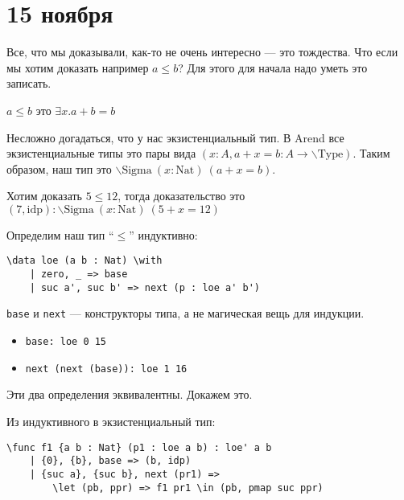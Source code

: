 \chapter{15 ноября}

Все, что мы доказывали, как-то не очень интересно --- это тождества. Что если мы хотим доказать например \(a \leq b\)? Для этого для начала надо уметь это записать.

\begin{definition}
    \(a \leq b\) это \(\exists x.a + b = b\)
\end{definition}

Несложно догадаться, что у нас экзистенциальный тип. В Arend все экзистенциальные типы это пары вида \((x : A, a + x = b : A \to \mathrm{\backslash Type})\). Таким образом, наш тип это \(\mathrm{\backslash Sigma}\ (x : \mathrm{Nat})\ (a + x = b)\).

\begin{example}
    Хотим доказать \(5 \leq 12\), тогда доказательство это \((7, \mathrm{idp}) : \mathrm{\backslash Sigma}\ (x : \mathrm{Nat})\ (5 + x = 12)\)
\end{example}

Определим наш тип ``\( \leq \)'' индуктивно:
\begin{verbatim}
\data loe (a b : Nat) \with
    | zero, _ => base
    | suc a', suc b' => next (p : loe a' b')
\end{verbatim}

\begin{remark}
    \texttt{base} и \texttt{next} --- конструкторы типа, а не магическая вещь для индукции.
\end{remark}

\begin{example}\itemfix
    \begin{itemize}
        \item \verb!base: loe 0 15!
        \item \verb!next (next (base)): loe 1 16!
    \end{itemize}
\end{example}

Эти два определения эквивалентны. Докажем это.

Из индуктивного в экзистенциальный тип:
\begin{verbatim}
\func f1 {a b : Nat} (p1 : loe a b) : loe' a b
    | {0}, {b}, base => (b, idp)
    | {suc a}, {suc b}, next (pr1) =>
        \let (pb, ppr) => f1 pr1 \in (pb, pmap suc ppr)
\end{verbatim}

